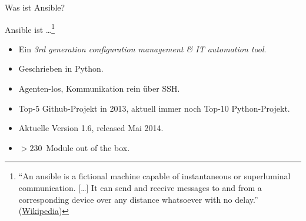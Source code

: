 \begin{frame}{Was ist Ansible?}

  Ansible ist \dots\footnote{``An ansible is a fictional machine capable
  of instantaneous or superluminal communication. [\dots] It can send
  and receive messages to and from a corresponding device over any
  distance whatsoever with no delay.''
  (\href{https://en.wikipedia.org/wiki/Ansible}{Wikipedia})}

  \pause
  \begin{itemize}
    \item Ein \emph{3rd generation configuration management \&{} IT
    automation tool}.

    \item Geschrieben in Python.

    \item Agenten-los, Kommunikation rein über SSH.

    \item Top-5 Github-Projekt in 2013, aktuell immer noch Top-10
    Python-Projekt.

    \item Aktuelle Version 1.6, released Mai 2014.

    \item $> 230$~Module out of the box.
  \end{itemize}
\end{frame}


